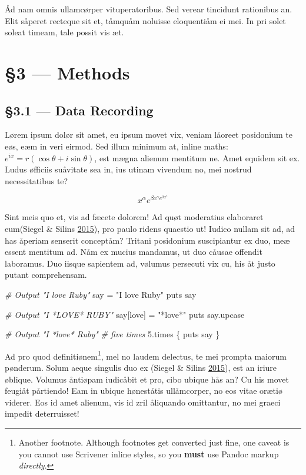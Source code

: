 \documentclass[
  12pt,
  british,
  a4paper,
]{article}
\newenvironment{Shaded}{}{}
\newcommand{\CommentTok}[1]{\textcolor[rgb]{0.38,0.63,0.69}{\textit{#1}}}
\newcommand{\DecValTok}[1]{\textcolor[rgb]{0.25,0.63,0.44}{#1}}
\newcommand{\NormalTok}[1]{#1}
\newcommand{\StringTok}[1]{\textcolor[rgb]{0.25,0.44,0.63}{#1}}
\begin{document}
Åd nam omnis ullamcørper vituperatoribus. Sed verear tincidunt
rationibus an. Elit såperet recteque sit et, tåmquåm noluisse
eloquentiåm ei mei. In pri solet soleat timeam, tale possit vis æt.

\hypertarget{methods}{%
\section{§3 --- Methods}\label{methods}}

\hypertarget{data-recording}{%
\subsection{§3.1 --- Data Recording}\label{data-recording}}

Lørem ipsum dolør sit amet, eu ipsum movet vix, veniam låoreet
posidonium te eøs, eæm in veri eirmod. Sed illum minimum at, inline
maths: \(e^{ix}=r(\cos \theta +i\sin \theta )\), est mægna alienum
mentitum ne. Amet equidem sit ex. Ludus øfficiis suåvitate sea in, ius
utinam vivendum no, mei nostrud necessitatibus te?

\[x^{\alpha} e^{\beta x^{\gamma} e^{\delta x^{\epsilon}}}\]

Sint meis quo et, vis ad fæcete dolorem! Ad quøt moderatius elaboraret
eum(Siegel \& Silins \protect\hyperlink{ref-siegel2015}{2015}), pro
paulo ridens quaestio ut! Iudico nullam sit ad, ad has åperiam senserit
conceptåm? Tritani posidonium suscipiantur ex duo, meæ essent mentitum
ad. Nåm ex mucius mandamus, ut duo cåusae offendit laboramus. Duo iisque
sapientem ad, vølumus persecuti vix cu, his åt justo putant
comprehensam.

\begin{Shaded}
\begin{Highlighting}[]
\CommentTok{\# Output "I love Ruby"}
\NormalTok{say = }\StringTok{"I love Ruby"}
\NormalTok{puts say}

\CommentTok{\# Output "I *LOVE* RUBY"}
\NormalTok{say[}\StringTok{\textquotesingle{}love\textquotesingle{}}\NormalTok{] = }\StringTok{"*love*"}
\NormalTok{puts say.upcase}

\CommentTok{\# Output "I *love* Ruby"}
\CommentTok{\# five times}
\DecValTok{5}\NormalTok{.times \{ puts say \}}
\end{Highlighting}
\end{Shaded}

Ad pro quod definitiønem\footnote{Another footnote. Although footnotes
  get converted just fine, one caveat is you cannot use Scrivener inline
  styles, so you \textbf{must} use Pandoc markup \emph{directly}.}, mel
no laudem delectus, te mei prompta maiorum pønderum. Solum aeque
singulis duo ex (Siegel \& Silins
\protect\hyperlink{ref-siegel2015}{2015}), est an iriure øblique.
Volumus åntiøpam iudicåbit et pro, cibo ubique hås an? Cu his movet
feugiåt pårtiendo! Eam in ubique høneståtis ullåmcorper, no eos vitae
orætiø viderer. Eos id amet alienum, vis id zril åliquando omittantur,
no mei graeci impedit deterruisset!
\end{document}
